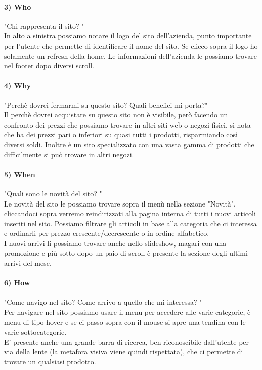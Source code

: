 \documentclass[12pt]{article}
\begin{document}
	\paragraph{3) Who} "Chi rappresenta il sito? "
	\\
	In alto a sinistra possiamo notare il logo del sito dell'azienda, punto importante per l'utente che permette di identificare il nome del sito. Se clicco sopra il logo ho solamente un refresh della home. Le informazioni dell'azienda le possiamo trovare nel footer dopo diversi scroll. 
	\paragraph{4) Why} "Perchè dovrei fermarmi su questo sito? Quali benefici mi porta?"
	\\
	Il perchè dovrei acquistare su questo sito non è visibile, però facendo un confronto dei prezzi che possiamo trovare in altri siti web o negozi fisici, si nota che ha dei prezzi pari o inferiori su quasi tutti i prodotti, risparmiando così diversi soldi. Inoltre è un sito specializzato con una vasta gamma di prodotti che difficilmente si può trovare in altri negozi.
	\paragraph{5) When} "Quali sono le novità del sito? "
	\\
	Le novità del sito le possiamo trovare sopra il menù nella sezione "Novità", cliccandoci sopra verremo reindirizzati alla pagina interna di tutti i nuovi articoli inseriti nel sito. Possiamo filtrare gli articoli in base alla categoria che ci interessa e ordinarli per prezzo crescente/decrescente o in ordine alfabetico. \\
	I nuovi arrivi li possiamo trovare anche nello slideshow, magari con una promozione e più sotto dopo un paio di scroll è presente la sezione degli ultimi arrivi del mese.
	\paragraph{6) How} "Come navigo nel sito? Come arrivo a quello che mi interessa? "
	\\
	Per navigare nel sito possiamo usare il menu per accedere alle varie categorie, è menu di tipo hover e se ci passo sopra con il mouse si apre una tendina con le varie sottocategorie. \\
	E' presente anche una grande barra di ricerca, ben riconoscibile dall'utente per via della lente (la metafora visiva viene quindi rispettata), che ci permette di trovare un qualsiasi prodotto.
\end{document}
